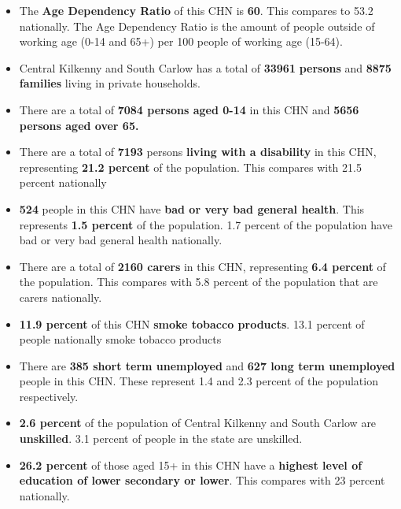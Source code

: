 \documentclass{article}
\begin{document}
\begin{itemize}

\item The \textbf{Age Dependency Ratio} of this CHN is  \textbf{60}. This compares to 53.2 nationally. The Age Dependency Ratio is the amount of people outside of working age (0-14 and 65+) per 100 people of working age (15-64). 

\item Central Kilkenny and South Carlow has a total of \textbf{\num{33961}} \textbf{persons} and  \textbf{\num{8875}} \textbf{families} living in private households.

\item There are a total of \textbf{\num{7084} persons aged 0-14} in this CHN and \textbf{\num{5656} persons aged over 65.} 

\item There are a total of \textbf{\num{7193}} persons \textbf{living with a disability} in this CHN, representing \textbf{21.2 percent} of the population. This compares with  21.5 percent nationally

\item \textbf{\num{524}} people in this CHN have \textbf{bad or very bad general health}. This represents \textbf{1.5 percent} of the population. 1.7 percent of the population have bad or very bad general health nationally. 

\item There are a total of \textbf{\num{2160} carers} in this CHN, representing \textbf{6.4 percent} of the population. This compares with 5.8 percent of the population that are carers nationally. 

\item \textbf{11.9 percent} of this CHN \textbf{smoke tobacco products}. 13.1 percent of people nationally smoke tobacco products

\item There are \textbf{\num{385} short term unemployed} and \textbf{\num{627} long term unemployed} people in this CHN. These represent 1.4 and 2.3 percent of the population respectively.

\item  \textbf{2.6 percent} of the population of Central Kilkenny and South Carlow are \textbf{unskilled}. 3.1 percent of people in the state are unskilled.

\item \textbf{26.2 percent} of those aged 15+ in this CHN have a \textbf{highest level of education of lower secondary or lower}. This compares with 23 percent nationally. 


\end{itemize}
\end{document}
